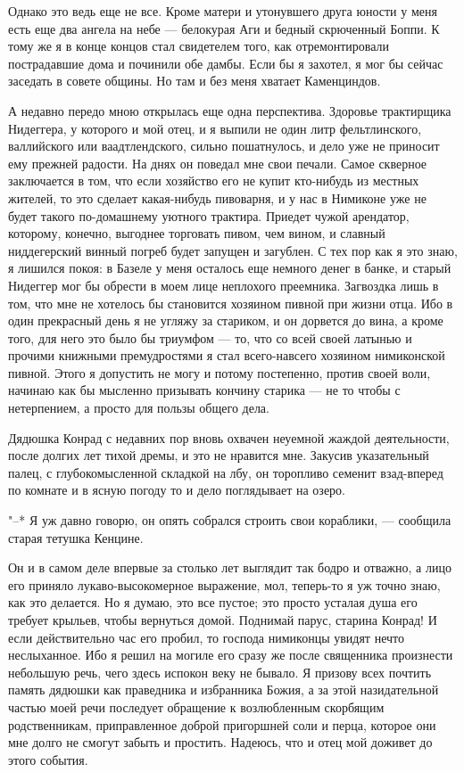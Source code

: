 Однако это ведь  еще не все. Кроме матери и  утонувшего друга юности у
меня есть еще два ангела на небе --- белокурая Аги и бедный скрюченный
Боппи.  К  тому  же  я  в  конце  концов  стал  свидетелем  того,  как
отремонтировали  пострадавшие дома  и починили  обе дамбы.  Если бы  я
захотел, я мог бы  сейчас заседать в совете общины. Но  там и без меня
хватает Каменциндов.

А  недавно  передо  мною  открылась  еще  одна  перспектива.  Здоровье
трактирщика Нидеггера, у которого и мой  отец, и я выпили не один литр
фельтлинского, валлийского  или ваадтлендского, сильно  пошатнулось, и
дело уже не приносит ему прежней  радости. На днях он поведал мне свои
печали. Самое  скверное заключается в  том, что если хозяйство  его не
купит  кто-нибудь  из местных  жителей,  то  это сделает  какая-нибудь
пивоварня,  и  у нас  в  Нимиконе  уже  не будет  такого  по-домашнему
уютного трактира. Приедет чужой арендатор, которому, конечно, выгоднее
торговать пивом, чем вином, и славный ниддегерский винный погреб будет
запущен и  загублен. С  тех пор  как я  это знаю,  я лишился  покоя: в
Базеле у  меня осталось еще немного  денег в банке, и  старый Нидеггер
мог бы обрести в моем лице  неплохого преемника. Загвоздка лишь в том,
что мне не хотелось бы становится  хозяином пивной при жизни отца. Ибо
в один прекрасный день я не угляжу за стариком, и он дорвется до вина,
а кроме того, для него это было  бы триумфом --- то, что со всей своей
латынью и прочими книжными премудростями я стал всего-навсего хозяином
нимиконской пивной.  Этого я  допустить не  могу и  потому постепенно,
против своей воли,  начинаю как бы мысленно  призывать кончину старика
--- не то чтобы с нетерпением, а просто для пользы общего дела.

Дядюшка  Конрад   с  недавних   пор  вновь  охвачен   неуемной  жаждой
деятельности, после  долгих лет  тихой дремы, и  это не  нравится мне.
Закусив  указательный палец,  с глубокомысленной  складкой на  лбу, он
торопливо семенит  взад-вперед по комнате и  в ясную погоду то  и дело
поглядывает на озеро.

"--* Я уж давно говорю, он  опять собрался строить свои кораблики, ---
сообщила старая тетушка Кенцине.

Он и в самом деле впервые за столько лет выглядит так бодро и отважно,
а лицо его приняло лукаво-высокомерное  выражение, мол, теперь-то я уж
точно знаю, как  это делается. Но я думаю, это  все пустое; это просто
усталая  душа его  требует  крыльев, чтобы  вернуться домой.  Поднимай
парус, старина Конрад! И если действительно час его пробил, то господа
нимиконцы увидят нечто неслыханное. Ибо я решил на могиле его сразу же
после священника произнести небольшую речь, чего здесь испокон веку не
бывало.  Я  призову  всех  почтить память  дядюшки  как  праведника  и
избранника Божия, а  за этой назидательной частью  моей речи последует
обращение к возлюбленным скорбящим родственникам, приправленное доброй
пригоршней соли  и перца,  которое они  мне долго  не смогут  забыть и
простить. Надеюсь, что и отец мой доживет до этого события.

